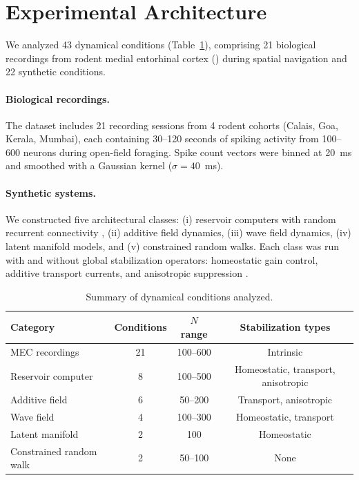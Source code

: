 \documentclass[aps,pre,reprint,twocolumn]{revtex4-2}
\newcommand{\mec}{\text{MEC}}
\begin{document}
\section{Experimental Architecture}

We analyzed 43 dynamical conditions (Table~\ref{tab:conditions}), comprising 21 biological recordings from rodent medial entorhinal cortex (\mec) during spatial navigation and 22 synthetic conditions.

\paragraph{Biological recordings.}
The \mec{} dataset includes 21 recording sessions from 4 rodent cohorts (Calais, Goa, Kerala, Mumbai), each containing 30--120 seconds of spiking activity from 100--600 neurons during open-field foraging. Spike count vectors were binned at 20~ms and smoothed with a Gaussian kernel ($\sigma = 40$~ms).

\paragraph{Synthetic systems.}
We constructed five architectural classes: (i) reservoir computers with random recurrent connectivity \cite{jaeger2001,maass2002}, (ii) additive field dynamics, (iii) wave field dynamics, (iv) latent manifold models, and (v) constrained random walks. Each class was run with and without global stabilization operators: homeostatic gain control, additive transport currents, and anisotropic suppression \cite{vogels2011,zenke2015}.

\begin{table}
\caption{Summary of dynamical conditions analyzed.}
\label{tab:conditions}
\begin{ruledtabular}
\begin{tabular}{lccc}
Category & Conditions & $N$ range & Stabilization types \\
\hline
MEC recordings & 21 & 100--600 & Intrinsic \\
Reservoir computer & 8 & 100--500 & Homeostatic, transport, anisotropic \\
Additive field & 6 & 50--200 & Transport, anisotropic \\
Wave field & 4 & 100--300 & Homeostatic, transport \\
Latent manifold & 2 & 100 & Homeostatic \\
Constrained random walk & 2 & 50--100 & None \\
\end{tabular}
\end{ruledtabular}
\end{table}
\end{document}

